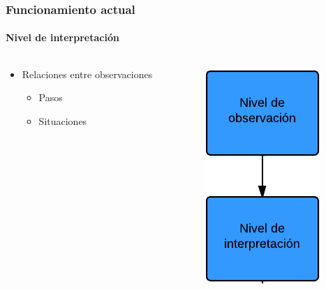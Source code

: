 \begin{frame}
	\frametitle{Funcionamiento actual}
	\framesubtitle{Nivel de interpretaci\'on}
	
	\begin{columns}[T] %
		\begin{column}[T]{5cm} %
			\begin{itemize}
				\item Relaciones entre observaciones
				\begin{itemize}
					\item Pasos
					\item Situaciones
				\end{itemize}
			\end{itemize}
		\end{column}
		\begin{column}[T]{5cm} %
			\includegraphics[width=0.5\linewidth]{./Figures/NivelDeInterpretacion.png}
		\end{column}
	\end{columns}
\end{frame}

